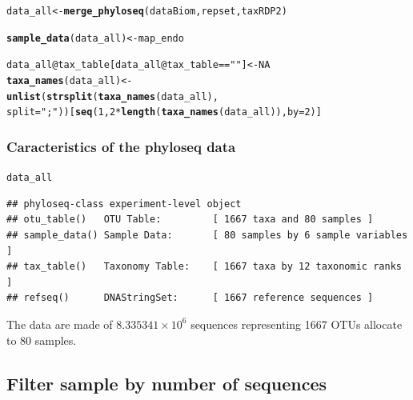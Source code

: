 \documentclass[12pt]{article}\usepackage[]{graphicx}\usepackage[]{color}
\makeatletter
\newcommand{\hlnum}[1]{\textcolor[rgb]{0.686,0.059,0.569}{#1}}%
\newcommand{\hlstr}[1]{\textcolor[rgb]{0.192,0.494,0.8}{#1}}%
\newcommand{\hlopt}[1]{\textcolor[rgb]{0,0,0}{#1}}%
\newcommand{\hlstd}[1]{\textcolor[rgb]{0.345,0.345,0.345}{#1}}%
\newcommand{\hlkwb}[1]{\textcolor[rgb]{0.69,0.353,0.396}{#1}}%
\newcommand{\hlkwc}[1]{\textcolor[rgb]{0.333,0.667,0.333}{#1}}%
\newcommand{\hlkwd}[1]{\textcolor[rgb]{0.737,0.353,0.396}{\textbf{#1}}}%
\newenvironment{kframe}{%
 \def\at@end@of@kframe{}%
 \ifinner\ifhmode%
  \def\at@end@of@kframe{\end{minipage}}%
  \begin{minipage}{\columnwidth}%
 \fi\fi%
 \def\FrameCommand##1{\hskip\@totalleftmargin \hskip-\fboxsep
 \colorbox{shadecolor}{##1}\hskip-\fboxsep
     \hskip-\linewidth \hskip-\@totalleftmargin \hskip\columnwidth}%
 \MakeFramed {\advance\hsize-\width
   \@totalleftmargin\z@ \linewidth\hsize
   \@setminipage}}%
 {\par\unskip\endMakeFramed%
 \at@end@of@kframe}
\newenvironment{knitrout}{}{} %
\numberwithin{figure}{section}
\makeatother
\begin{document}
\begin{knitrout}\small
{}\color{fgcolor}\begin{kframe}
\begin{alltt}
\hlstd{data_all} \hlkwb{<-} \hlkwd{merge_phyloseq}\hlstd{(dataBiom, repset, taxRDP2)}

\hlkwd{sample_data}\hlstd{(data_all)} \hlkwb{<-} \hlstd{map_endo}

\hlstd{data_all}\hlopt{@}\hlkwc{tax_table}\hlstd{[data_all}\hlopt{@}\hlkwc{tax_table} \hlopt{==} \hlstr{""}\hlstd{]} \hlkwb{<-} \hlnum{NA}
\hlkwd{taxa_names}\hlstd{(data_all)} \hlkwb{<-}
  \hlkwd{unlist}\hlstd{(}\hlkwd{strsplit}\hlstd{(}\hlkwd{taxa_names}\hlstd{(data_all) ,}
                  \hlkwc{split} \hlstd{=} \hlstr{";"}\hlstd{))[}\hlkwd{seq}\hlstd{(}\hlnum{1}\hlstd{,} \hlnum{2}\hlopt{*}\hlkwd{length}\hlstd{(}\hlkwd{taxa_names}\hlstd{(data_all)),} \hlkwc{by}\hlstd{=}\hlnum{2}\hlstd{)]}
\end{alltt}
\end{kframe}
\end{knitrout}

\subsubsection{Caracteristics of the phyloseq data}

\begin{knitrout}\small
{}\color{fgcolor}\begin{kframe}
\begin{alltt}
\hlstd{data_all}
\end{alltt}
\begin{verbatim}
## phyloseq-class experiment-level object
## otu_table()   OTU Table:         [ 1667 taxa and 80 samples ]
## sample_data() Sample Data:       [ 80 samples by 6 sample variables ]
## tax_table()   Taxonomy Table:    [ 1667 taxa by 12 taxonomic ranks ]
## refseq()      DNAStringSet:      [ 1667 reference sequences ]
\end{verbatim}
\end{kframe}
\end{knitrout}

The data are made of \ensuremath{8.335341\times 10^{6}} sequences representing 1667 OTUs allocate to 80 samples.

  \subsection{Filter sample by number of sequences}
\end{document}
